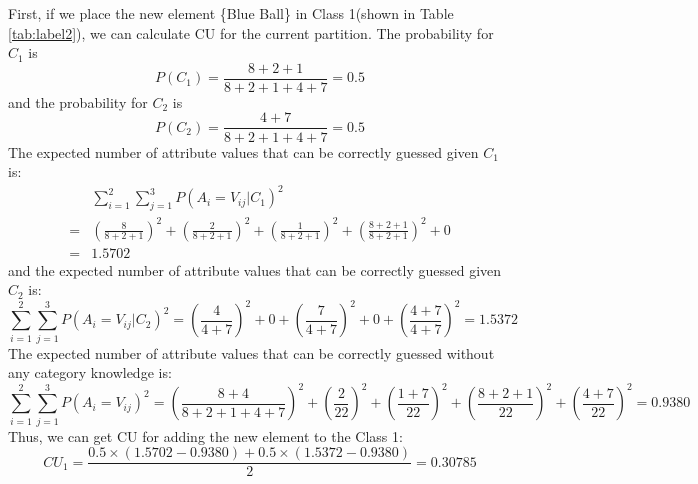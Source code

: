 First, if we place the new element \{Blue Ball\} in Class 1(shown in Table \ref{tab:label2}), we can calculate CU for the current partition. The probability for $C_1$ is $$P(C_1)=\frac{8+2+1}{8+2+1+4+7}=0.5$$ and the probability for $C_2$ is $$P(C_2)=\frac{4+7}{8+2+1+4+7}=0.5$$ 
The expected number of attribute values that can be correctly guessed given $C_1$ is: 
\begin{equation*}
\begin{aligned}
&\sum_{i=1}^{2} \sum_{j=1}^{3}P(A_i =V_{ij}\left|C_1\right.)^2\\
=&(\frac{8}{8+2+1})^2+(\frac{2}{8+2+1})^2+(\frac{1}{8+2+1})^2+(\frac{8+2+1}{8+2+1})^2+0\\
=&1.5702
\end{aligned}
\end{equation*} %
and the expected number of attribute values that can be correctly guessed given $C_2$ is: $$\sum_{i=1}^{2} \sum_{j=1}^{3}P(A_i=V_{ij}\left|C_2\right.)^2=(\frac{4}{4+7})^2+0+(\frac{7}{4+7})^2+0+(\frac{4+7}{4+7})^2=1.5372$$
The expected number of attribute values that can be correctly guessed without any category knowledge is: $$\sum_{i=1}^{2} \sum_{j=1}^{3}P(A_i=V_{ij})^2=(\frac{8+4}{8+2+1+4+7})^2+(\frac{2}{22})^2+(\frac{1+7}{22})^2+(\frac{8+2+1}{22})^2+(\frac{4+7}{22})^2=0.9380$$ 
Thus, we can get CU for adding the new element to the Class 1: $$CU_1=\frac{0.5\times(1.5702-0.9380)+0.5\times(1.5372-0.9380)}{2}=0.30785$$

\begin{table}[!ht]
\end{table}

